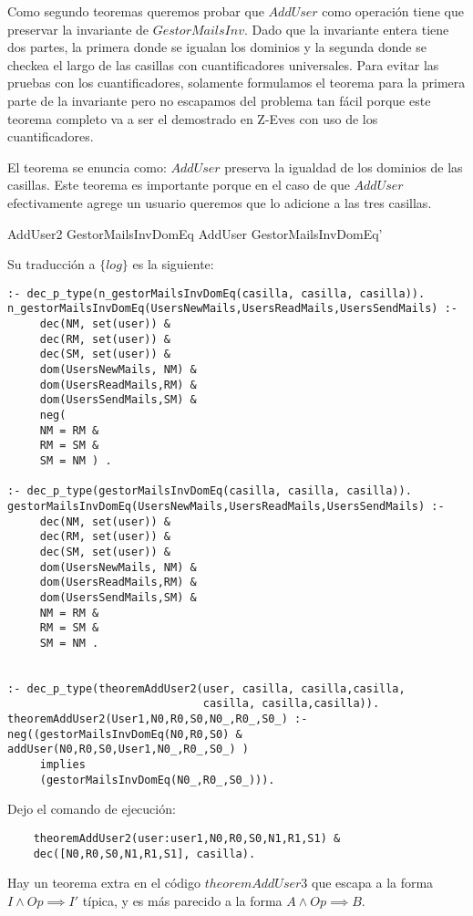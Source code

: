Como segundo teoremas queremos probar que $AddUser$ como operación tiene que preservar la invariante de $GestorMailsInv$. Dado que la invariante entera tiene dos partes, la primera donde se igualan los dominios y la segunda donde se checkea el largo de las casillas con cuantificadores universales. Para evitar las pruebas con los cuantificadores, solamente formulamos el teorema para la primera parte de la invariante pero no escapamos del problema tan fácil porque este teorema completo va a ser el demostrado en Z-Eves con uso de los cuantificadores.

El teorema se enuncia como: $AddUser$ preserva la igualdad de los dominios de las casillas. Este teorema es importante porque en el caso de que $AddUser$ efectivamente agrege un usuario queremos que lo adicione a las tres casillas.

\begin{theorem}{AddUser2}
GestorMailsInvDomEq \land AddUser \implies GestorMailsInvDomEq'
\end{theorem}


Su traducción a $\{log\}$ es la siguiente: \newpage
\begin{verbatim}
:- dec_p_type(n_gestorMailsInvDomEq(casilla, casilla, casilla)).
n_gestorMailsInvDomEq(UsersNewMails,UsersReadMails,UsersSendMails) :-
     dec(NM, set(user)) &
     dec(RM, set(user)) &
     dec(SM, set(user)) & 
     dom(UsersNewMails, NM) &
     dom(UsersReadMails,RM) &
     dom(UsersSendMails,SM) &
     neg(
     NM = RM &
     RM = SM & 
     SM = NM ) .

:- dec_p_type(gestorMailsInvDomEq(casilla, casilla, casilla)).
gestorMailsInvDomEq(UsersNewMails,UsersReadMails,UsersSendMails) :-
     dec(NM, set(user)) &
     dec(RM, set(user)) &
     dec(SM, set(user)) & 
     dom(UsersNewMails, NM) &
     dom(UsersReadMails,RM) &
     dom(UsersSendMails,SM) &
     NM = RM &
     RM = SM & 
     SM = NM .


:- dec_p_type(theoremAddUser2(user, casilla, casilla,casilla, 
                              casilla, casilla,casilla)). 
theoremAddUser2(User1,N0,R0,S0,N0_,R0_,S0_) :-
neg((gestorMailsInvDomEq(N0,R0,S0) & addUser(N0,R0,S0,User1,N0_,R0_,S0_) ) 
     implies
     (gestorMailsInvDomEq(N0_,R0_,S0_))).
\end{verbatim}

Dejo el comando de ejecución:
\begin{verbatim}
    theoremAddUser2(user:user1,N0,R0,S0,N1,R1,S1) & 
    dec([N0,R0,S0,N1,R1,S1], casilla).
\end{verbatim}

Hay un teorema extra en el código $theoremAddUser3$ que escapa a la forma $I \land Op \implies I'$ típica, y es más parecido a la forma $A \land Op \implies B$.
